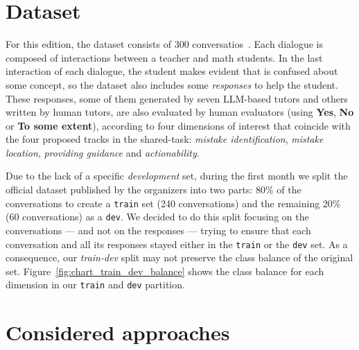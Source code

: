 \documentclass[11pt]{article}
\newcommand{\todo}[1]{\textcolor{blue}{\textbf{\small [TODO: #1]}}}
\begin{document}
\section{Dataset}
\label{sec:dataset}


For this edition, the dataset consists of 300 conversatios~\cite{maurya-etal-2025-unifying}.
Each dialogue is composed of interactions between a teacher and math students.
In the last interaction of each dialogue, the student makes evident that is confused about some concept, so the dataset also includes 
some \textit{responses} to help the student.
These responses, some of them generated by seven LLM-based tutors and others written by human tutors,  are also evaluated by human evaluators (using \textbf{Yes}, \textbf{No} or \textbf{To some extent}), according to four dimensions of interest that coincide with the four proposed tracks in the shared-task: \textit{mistake identification}, \textit{mistake location}, \textit{providing guidance} and \textit{actionability}.

Due to the lack of a specific \textit{development} set, during the first month we split the official dataset published by the organizers into two parts: 80\% of the conversations to create a \texttt{train} set (240 conversations) and the remaining 20\% (60 conversations) as a \texttt{dev}. 
We decided to do this split focusing on the conversations --- and not on the responses --- trying to ensure that each conversation and all its responses stayed either in the \texttt{train} or the \texttt{dev} set. 
As a consequence, our \textit{train-dev} split may not preserve the class balance of the original set.
Figure~\ref{fig:chart_train_dev_balance} shows the class balance for each dimension in our \texttt{train} and \texttt{dev} partition. 




\section{Considered approaches}
\label{sec:approaches}
\end{document}
